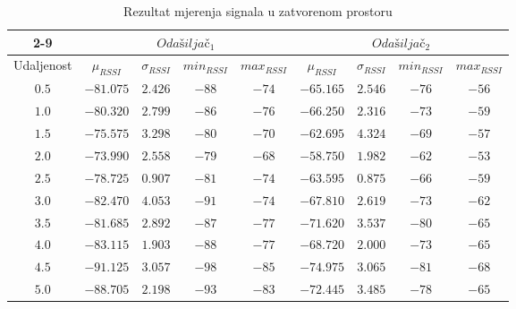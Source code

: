 \begin{table}[H]
    \centering
    \caption{Rezultat mjerenja signala u zatvorenom prostoru}
    \label{tbl:indoor}
	    \begin{tabular}{|c|cccc||cccc|}%
	    \cline{2-9}
	    \multicolumn{1}{!{\vrule width 0pt}c!{\vrule width 1pt}}{} & \multicolumn{4}{c||}{$Odašiljač_1$} & \multicolumn{4}{c|}{$Odašiljač_2$} \\ %
	\hline 
	Udaljenost & $\mu_{RSSI}$ & $\sigma_{RSSI}$ & $min_{RSSI}$ & $max_{RSSI}$ & $\mu_{RSSI}$ & $\sigma_{RSSI}$ & $min_{RSSI}$ & $max_{RSSI}$ \\ %
	\hline 
	$0.5$ & $-81.075$ & $2.426$ & $-88$ & $-74$ & $-65.165$ & $2.546$ & $-76$ & $-56$ \\ %
	$1.0$ & $-80.320$ & $2.799$ & $-86$ & $-76$ & $-66.250$ & $2.316$ & $-73$ & $-59$ \\ %
	$1.5$ & $-75.575$ & $3.298$ & $-80$ & $-70$ & $-62.695$ & $4.324$ & $-69$ & $-57$ \\ %
	$2.0$ & $-73.990$ & $2.558$ & $-79$ & $-68$ & $-58.750$ & $1.982$ & $-62$ & $-53$ \\ %
	$2.5$ & $-78.725$ & $0.907$ & $-81$ & $-74$ & $-63.595$ & $0.875$ & $-66$ & $-59$ \\ %
	$3.0$ & $-82.470$ & $4.053$ & $-91$ & $-74$ & $-67.810$ & $2.619$ & $-73$ & $-62$ \\ %
	$3.5$ & $-81.685$ & $2.892$ & $-87$ & $-77$ & $-71.620$ & $3.537$ & $-80$ & $-65$ \\ %
	$4.0$ & $-83.115$ & $1.903$ & $-88$ & $-77$ & $-68.720$ & $2.000$ & $-73$ & $-65$ \\ %
	$4.5$ & $-91.125$ & $3.057$ & $-98$ & $-85$ & $-74.975$ & $3.065$ & $-81$ & $-68$ \\ %
	$5.0$ & $-88.705$ & $2.198$ & $-93$ & $-83$ & $-72.445$ & $3.485$ & $-78$ & $-65$ \\ %

\end{tabular}
\end{table}
